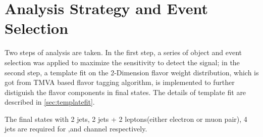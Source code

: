 \section{Analysis Strategy and Event Selection}\label{sec:event_selection}
Two steps of analysis are taken. In the first step, a series of object and event selection was applied to maximize the sensitivity to detect the signal; in the second step,  a template fit on the 2-Dimension flavor weight distribution, which is got from TMVA based flavor tagging algorithm, is implemented to further distiguish the flavor components in final states. The details of template fit are described in \ref{sec:templatefit}.\par
The final states with 2 jets, 2 jets + 2 leptons(either electron or muon pair), 4 jets are required for \nnh,\llh and \qqh channel respectively.
\par



